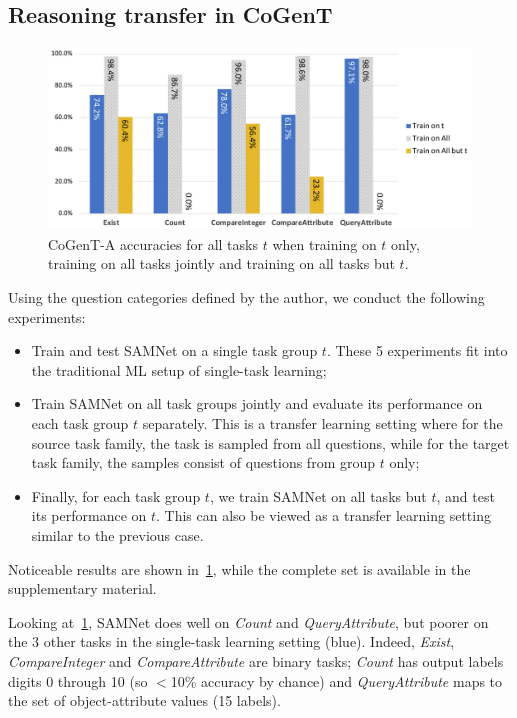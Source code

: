 \subsection{Reasoning transfer in CoGenT}
\label{sec:reasoning-clevr}

\begin{figure}[htbp]
	\centering
	\includegraphics[width=\columnwidth]{../results/CoGenT_results_new.pdf}
	\caption{CoGenT-A accuracies for all tasks $t$ when training on $t$ only, training on all tasks jointly and training on all tasks but $t$.}
	\label{fig:CoGenT-results}
\end{figure}

Using the question categories defined by the author, we conduct the following experiments:
\begin{itemize}
	\compresslist
	\item Train and test SAMNet on a single task group $t$. These 5 experiments fit into the traditional ML setup of single-task learning;
	\item Train SAMNet on all task groups jointly and evaluate its performance on each task group $t$ separately.
	This is a transfer learning setting where for the source task family, the task is sampled from all questions, while for the target task family, the samples consist of questions from group $t$ only;
	\item Finally, for each task group $t$, we train SAMNet on all tasks but $t$, and test its performance on $t$. This can also be viewed as a transfer learning setting similar to the previous case.
\end{itemize}

Noticeable results are shown in~\cref{fig:CoGenT-results}, while the complete set is available in the supplementary material.

Looking at~\cref{fig:CoGenT-results}, SAMNet does well on \textit{Count} and \textit{QueryAttribute}, but poorer on the 3 other tasks in the single-task learning setting (blue). Indeed, \textit{Exist}, \textit{CompareInteger} and \textit{CompareAttribute} are binary tasks; \textit{Count} has output labels digits 0 through 10 (so $<$10\% accuracy by chance) and \textit{QueryAttribute} maps to the set of object-attribute values (15 labels).

